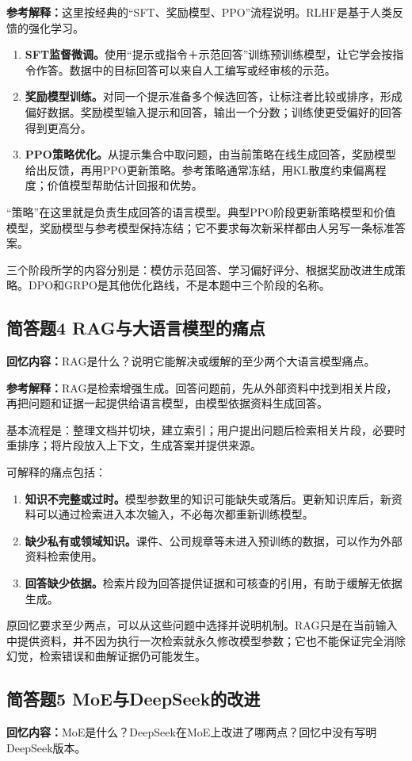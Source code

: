 \documentclass[UTF8,a4paper,zihao=-4,fontset=windows]{ctexart}
\newcommand{\recalled}[1]{\Needspace{8\baselineskip}\subsection*{#1}}
\begin{document}
\textbf{参考解释：}这里按经典的“SFT、奖励模型、PPO”流程说明。RLHF是基于人类反馈的强化学习。
\begin{enumerate}
\item {}\textbf{SFT监督微调。}使用“提示或指令＋示范回答”训练预训练模型，让它学会按指令作答。数据中的目标回答可以来自人工编写或经审核的示范。
\item {}\textbf{奖励模型训练。}对同一个提示准备多个候选回答，让标注者比较或排序，形成偏好数据。奖励模型输入提示和回答，输出一个分数；训练使更受偏好的回答得到更高分。
\item {}\textbf{PPO策略优化。}从提示集合中取问题，由当前策略在线生成回答，奖励模型给出反馈，再用PPO更新策略。参考策略通常冻结，用KL散度约束偏离程度；价值模型帮助估计回报和优势。
\end{enumerate}
“策略”在这里就是负责生成回答的语言模型。典型PPO阶段更新策略模型和价值模型，奖励模型与参考模型保持冻结；它不要求每次新采样都由人另写一条标准答案。

三个阶段所学的内容分别是：模仿示范回答、学习偏好评分、根据奖励改进生成策略。DPO和GRPO是其他优化路线，不是本题中三个阶段的名称。

\recalled{简答题4 RAG与大语言模型的痛点}
\textbf{回忆内容：}RAG是什么？说明它能解决或缓解的至少两个大语言模型痛点。

\textbf{参考解释：}RAG是检索增强生成。回答问题前，先从外部资料中找到相关片段，再把问题和证据一起提供给语言模型，由模型依据资料生成回答。

基本流程是：整理文档并切块，建立索引；用户提出问题后检索相关片段，必要时重排序；将片段放入上下文，生成答案并提供来源。

可解释的痛点包括：
\begin{enumerate}
\item {}\textbf{知识不完整或过时。}模型参数里的知识可能缺失或落后。更新知识库后，新资料可以通过检索进入本次输入，不必每次都重新训练模型。
\item {}\textbf{缺少私有或领域知识。}课件、公司规章等未进入预训练的数据，可以作为外部资料检索使用。
\item {}\textbf{回答缺少依据。}检索片段为回答提供证据和可核查的引用，有助于缓解无依据生成。
\end{enumerate}
原回忆要求至少两点，可以从这些问题中选择并说明机制。RAG只是在当前输入中提供资料，并不因为执行一次检索就永久修改模型参数；它也不能保证完全消除幻觉，检索错误和曲解证据仍可能发生。

\recalled{简答题5 MoE与DeepSeek的改进}
\textbf{回忆内容：}MoE是什么？DeepSeek在MoE上改进了哪两点？回忆中没有写明DeepSeek版本。
\end{document}
